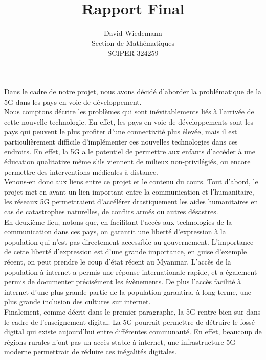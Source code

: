 \documentclass[11pt, a4paper]{article}
\begin{document}
\title{Rapport Final}
\author{David Wiedemann\\
Section de Mathématiques\\
SCIPER 324259}
\maketitle
Dans le cadre de notre projet, nous avons décidé d'aborder la problématique de la 5G dans les pays en voie de développement.\\
Nous comptons décrire les problèmes qui sont inévitablements liés à l'arrivée de cette nouvelle technologie.
En effet, les pays en voie de développements sont les pays qui peuvent le plus profiter d'une connectivité plus élevée, mais il est particulièrement difficile d'implémenter ces nouvelles technologies dans ces endroits.
En effet, la 5G a le potentiel de permettre aux enfants d'accéder à une éducation qualitative même s'ils viennent de milieux non-privilégiés, ou encore permettre des interventions médicales à distance.\\

Venons-en donc aux liens entre ce projet et le contenu du cours.
Tout d'abord,  le projet met en avant un lien important entre la communication et l'humanitaire, les réseaux 5G permettraient d'accélérer drastiquement les aides humanitaires en cas de catastrophes naturelles, de conflits armés ou autres désastres.\\

En deuxième lieu, notons que, en facilitant l'accès aux technologies de la communication dans ces pays, on garantit une liberté d'expression à la population qui n'est pas directement accessible au gouvernement.
L'importance de cette liberté d'expression est d'une grande importance, en guise d'exemple récent, on peut prendre le coup d'état récent au Myanmar.
L'accès  de la population à internet a permis une réponse internationale rapide, et a également permis de documenter précisément les évènements.
De plus l'accès facilité à internet d'une plus grande partie de la population garantira, à long terme, une plus grande inclusion des cultures sur internet.\\

Finalement, comme décrit dans le premier paragraphe, la 5G rentre bien sur dans le cadre de l'enseignement digital.
La 5G pourrait permettre de détruire le fossé digital qui existe aujourd'hui entre différentes communauté. 
En effet, beaucoup de régions rurales n'ont pas un accès stable à internet, une infrastructure 5G moderne permettrait de réduire ces inégalités digitales.
\end{document}
